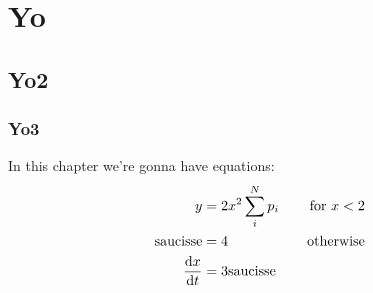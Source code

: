 \chapter{Yo}\label{chapter2}
\section{Yo2}
\subsection{Yo3}
In this chapter we're gonna have equations:
\begin{alignat}{2}
y &= 2 x^2 \sum_i^N p_i \quad &\textrm{for } x < 2\\
\textrm{saucisse} &= 4\quad &\textrm{otherwise}\\
\frac{\textrm{d}{x}}{\textrm{d}{t}} &= 3 \textrm{saucisse}
\end{alignat}
